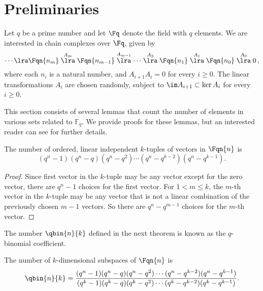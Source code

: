 \section{Preliminaries}
Let $q$ be a prime number and let $\Fq$ denote the field with $q$ elements. We are 
interested in chain complexes over $\Fq$, given by
\[
  \cdots \lra \Fqn{n_m} \stackrel{A_m}{\lra} \Fqn{n_{m-1}} 
  \stackrel{A_{m-1}}{\lra} \cdots \stackrel{A_2}{\lra} \Fqn{n_1} 
  \stackrel{A_1}{\lra} \Fqn{n_0} \stackrel{A_0}{\lra} 0 \, ,
\]
where each $n_i$ is a natural number, and $A_{i+1}A_i=0$ for every $i\geq 0$. The
linear transformations $A_i$ are chosen randomly, subject to $\im A_{i+1} \subset 
\ker A_{i}$ for every $i \geq 0$.

This section consists of several lemmas that count the number of elements in various sets related to $\mathbb{F}_q$.  We provide proofs for these lemmas, but an interested reader can see \cite{stanley2011enumerative} for further details. 
\begin{lemma}\label{NumkTup}
  The number of ordered, linear independent $k$-tuples of vectors in $\Fqn{n}$  is
\[
(q^n-1)(q^n-q)(q^n-q^2)\cdots(q^n - q^{k-2})(q^n-q^{k-1}).
\]
\end{lemma}

\begin{proof}
Since first vector in the $k$-tuple may be any vector except for the zero vector, there are $q^n-1$ choices for the first vector.  For $1<m \leq k$, the $m$-th vector in the $k$-tuple may be any vector that is not a linear combination of the previously chosen $m-1$ vectors. So there are $q^n - q^{m-1}$ choices for the $m$-th vector.
\end{proof}

The number $\qbin{n}{k}$ defined in the next theorem is known as the $q$-binomial coefficient.

\begin{lemma}\label{NumkSub}
  The number of $k$-dimensional subspaces of $\Fqn{n}$ is
\[
\qbin{n}{k} = \frac{(q^n-1)(q^n-q)(q^n-q^2)\cdots(q^n - q^{k-2})(q^n-q^{k-1})}{(q^k-1)(q^k-q)(q^k-q^2)\cdots(q^k - q^{k-2})(q^k-q^{k-1})}.
\]
\end{lemma}


